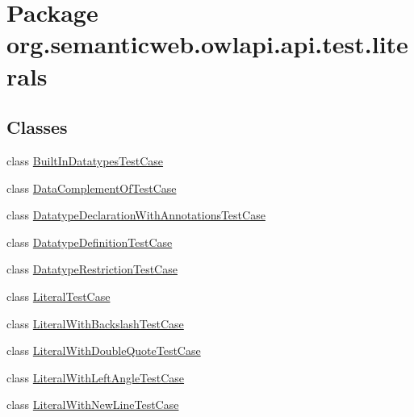 \hypertarget{namespaceorg_1_1semanticweb_1_1owlapi_1_1api_1_1test_1_1literals}{\section{Package org.\-semanticweb.\-owlapi.\-api.\-test.\-literals}
\label{namespaceorg_1_1semanticweb_1_1owlapi_1_1api_1_1test_1_1literals}
}
\subsection*{Classes}
\begin{DoxyCompactItemize}
\item 
class \hyperlink{classorg_1_1semanticweb_1_1owlapi_1_1api_1_1test_1_1literals_1_1_built_in_datatypes_test_case}{Built\-In\-Datatypes\-Test\-Case}
\item 
class \hyperlink{classorg_1_1semanticweb_1_1owlapi_1_1api_1_1test_1_1literals_1_1_data_complement_of_test_case}{Data\-Complement\-Of\-Test\-Case}
\item 
class \hyperlink{classorg_1_1semanticweb_1_1owlapi_1_1api_1_1test_1_1literals_1_1_datatype_declaration_with_annotations_test_case}{Datatype\-Declaration\-With\-Annotations\-Test\-Case}
\item 
class \hyperlink{classorg_1_1semanticweb_1_1owlapi_1_1api_1_1test_1_1literals_1_1_datatype_definition_test_case}{Datatype\-Definition\-Test\-Case}
\item 
class \hyperlink{classorg_1_1semanticweb_1_1owlapi_1_1api_1_1test_1_1literals_1_1_datatype_restriction_test_case}{Datatype\-Restriction\-Test\-Case}
\item 
class \hyperlink{classorg_1_1semanticweb_1_1owlapi_1_1api_1_1test_1_1literals_1_1_literal_test_case}{Literal\-Test\-Case}
\item 
class \hyperlink{classorg_1_1semanticweb_1_1owlapi_1_1api_1_1test_1_1literals_1_1_literal_with_backslash_test_case}{Literal\-With\-Backslash\-Test\-Case}
\item 
class \hyperlink{classorg_1_1semanticweb_1_1owlapi_1_1api_1_1test_1_1literals_1_1_literal_with_double_quote_test_case}{Literal\-With\-Double\-Quote\-Test\-Case}
\item 
class \hyperlink{classorg_1_1semanticweb_1_1owlapi_1_1api_1_1test_1_1literals_1_1_literal_with_left_angle_test_case}{Literal\-With\-Left\-Angle\-Test\-Case}
\item 
class \hyperlink{classorg_1_1semanticweb_1_1owlapi_1_1api_1_1test_1_1literals_1_1_literal_with_new_line_test_case}{Literal\-With\-New\-Line\-Test\-Case}

\end{DoxyCompactItemize}

